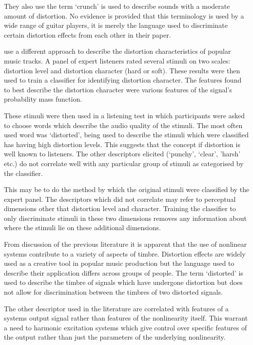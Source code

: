 	They also use the term `crunch' is used to describe sounds with a moderate amount of distortion. No evidence is
	provided that this terminology is used by a wide range of guitar players, it is merely the language used to
	discriminate certain distortion effects from each other in their paper.

	\citet{wilson2014characterisation} use a different approach to describe the distortion characteristics of popular
	music tracks. A panel of expert listeners rated several stimuli on two scales: distortion level and distortion
	character (hard or soft). These results were then used to train a classifier for identifying distortion character.
	The features found to best describe the distortion character were various features of the signal's probability mass
	function.

	These stimuli were then used in a listening test in which participants were asked to choose words which describe
	the audio quality of the stimuli. The most often used word was `distorted', being used to describe the stimuli
	which were classified has having high distortion levels. This suggests that the concept if distortion is well known
	to listeners. The other descriptors elicited (`punchy', `clear', 'harsh' etc.) do not correlate well with any
	particular group of stimuli as categorised by the classifier.

	This may be to do the method by which the original stimuli were classified by the expert panel. The descriptors
	which did not correlate may refer to perceptual dimensions other that distortion level and character. Training the
	classifier to only discriminate stimuli in these two dimensions removes any information about where the stimuli lie
	on these additional dimensions.

	From discussion of the previous literature it is apparent that the use of nonlinear systems contribute to a variety
	of aspects of timbre. Distortion effects are widely used as a creative tool in popular music production but the
	language used to describe their application differs across groups of people. The term `distorted' is used to
	describe the timbre of signals which have undergone distortion but does not allow for discrimination between the
	timbres of two distorted signals.

	The other descriptor used in the literature are correlated with features of a systems output signal rather than
	features of the nonlinearity itself. This warrant a need to harmonic excitation systems which give control over
	specific features of the output rather than just the parameters of the underlying nonlinearity. 

